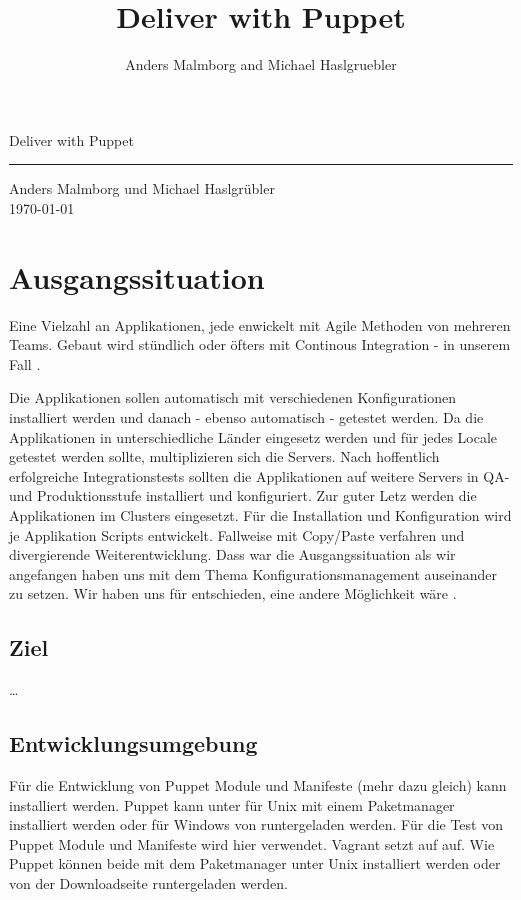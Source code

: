 \documentclass[12pt,a4paper,ngerman]{article}
\title{Deliver with Puppet}
\author{Anders Malmborg and Michael Haslgruebler}
\begin{document}
 \begin{titlepage}
     \begin{flushright}{\huge Deliver with Puppet}
	\end{flushright}
	\hrule
      
      \begin{flushright}
	  {\large Anders Malmborg und Michael Haslgrübler}\\
	  \today
	\end{flushright}
 \end{titlepage}

\pagestyle{plain}

\section{Ausgangssituation}

Eine Vielzahl an Applikationen, jede enwickelt mit Agile Methoden von mehreren Teams.
Gebaut wird stündlich oder öfters mit Continous Integration - in unserem Fall \cite{jenkins}.

Die Applikationen sollen automatisch mit verschiedenen Konfigurationen installiert werden und danach - ebenso automatisch - getestet werden.
Da die Applikationen in unterschiedliche Länder eingesetz werden und für jedes Locale getestet werden sollte, multiplizieren sich die Servers.
Nach hoffentlich erfolgreiche Integrationstests sollten die Applikationen auf
weitere Servers in QA- und Produktionsstufe installiert und konfiguriert.
Zur guter Letz werden die Applikationen im Clusters eingesetzt.
Für die Installation und Konfiguration wird je Applikation Scripts entwickelt. Fallweise mit Copy/Paste verfahren und divergierende Weiterentwicklung.
Dass war die Ausgangssituation als wir angefangen haben uns mit dem Thema Konfigurationsmanagement auseinander zu setzen. Wir haben uns für 
\cite{puppet} entschieden, eine andere Möglichkeit wäre \cite{chef}.

\subsection{Ziel}

\ldots



\subsection{Entwicklungsumgebung}

Für die Entwicklung von Puppet Module und Manifeste (mehr dazu gleich) kann \cite{geppeto} installiert werden.
Puppet kann unter für Unix mit einem Paketmanager installiert werden oder für Windows von \cite{puppetlabs} runtergeladen werden.
Für die Test von Puppet Module und Manifeste wird hier \cite{vagrant} verwendet. Vagrant setzt auf \cite{virtualbox} auf. 
Wie Puppet können beide mit dem Paketmanager unter Unix installiert werden oder von der Downloadseite runtergeladen werden.
\end{document}
